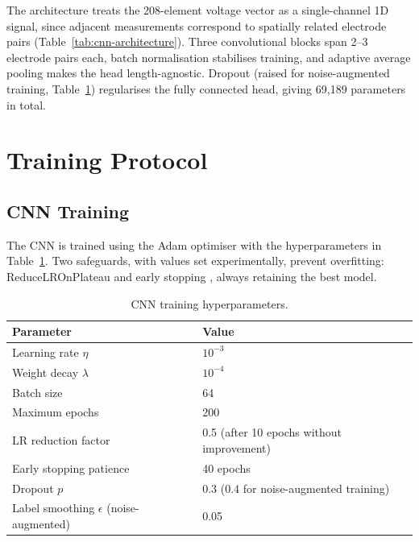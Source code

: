 The architecture treats the 208-element voltage vector as a single-channel 1D signal, since adjacent measurements correspond to spatially related electrode pairs (Table~\ref{tab:cnn-architecture}). Three convolutional blocks span 2--3 electrode pairs each, batch normalisation \parencite{ioffe2015batchnorm} stabilises training, and adaptive average pooling \parencite{lecun2015} makes the head length-agnostic. Dropout \parencite{srivastava2014dropout} (raised for noise-augmented training, Table~\ref{tab:cnn-hyperparams}) regularises the fully connected head, giving 69,189 parameters in total.


\section{Training Protocol}
\label{sec:method-training}

\subsection{CNN Training}
\label{sec:method-training-cnn}

The CNN is trained using the Adam optimiser \parencite{kingma2015adam} with the hyperparameters in Table~\ref{tab:cnn-hyperparams}. Two safeguards, with values set experimentally, prevent overfitting: ReduceLROnPlateau and early stopping \parencite{prechelt1998early}, always retaining the best model.

\begin{table}[htbp]
\centering
\caption[CNN training hyperparameters]{CNN training hyperparameters.}
\label{tab:cnn-hyperparams}
\small
\begin{tabular}{@{}ll@{}}
\toprule
\textbf{Parameter} & \textbf{Value} \\
\midrule
Learning rate $\eta$ & $10^{-3}$ \\
Weight decay $\lambda$ & $10^{-4}$ \\
Batch size & 64 \\
Maximum epochs & 200 \\
LR reduction factor & 0.5 (after 10 epochs without improvement) \\
Early stopping patience & 40 epochs \\
Dropout $p$ & 0.3 (0.4 for noise-augmented training) \\
Label smoothing $\epsilon$ (noise-augmented) & 0.05 \\
\bottomrule
\end{tabular}
\end{table}

